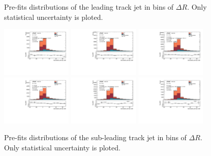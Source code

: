\begin{figure}[htbp]
\caption{Pre-fits \subsdzero distributions of the leading track jet in bins of $\Delta R$. Only statistical uncertainty is ploted.}
  \label{fig:dR-prefits-leading-sub}
\end{figure}


\begin{figure}[htbp]
  \centering
 \includegraphics[width=0.3\textwidth]{figures/gbb/Sub_Sd0_Fits/Canv_PreFit_02-DeltaR-025_LpT_INF_SpT_INF_coarse_y.pdf}
 \includegraphics[width=0.3\textwidth]{figures/gbb/Sub_Sd0_Fits/Canv_PreFit_025-DeltaR-03_LpT_INF_SpT_INF_coarse_y.pdf}
 \includegraphics[width=0.3\textwidth]{figures/gbb/Sub_Sd0_Fits/Canv_PreFit_03-DeltaR-04_LpT_INF_SpT_INF_coarse_y.pdf}\\
 \includegraphics[width=0.3\textwidth]{figures/gbb/Sub_Sd0_Fits/Canv_PreFit_04-DeltaR-05_LpT_INF_SpT_INF_coarse_y.pdf}
 \includegraphics[width=0.3\textwidth]{figures/gbb/Sub_Sd0_Fits/Canv_PreFit_05-DeltaR-06_LpT_INF_SpT_INF_coarse_y.pdf}
 \includegraphics[width=0.3\textwidth]{figures/gbb/Sub_Sd0_Fits/Canv_PreFit_06-DeltaR-07_LpT_INF_SpT_INF_coarse_y.pdf}\\

\caption{Pre-fits \subsdzero distributions of the sub-leading track jet in bins of $\Delta R$. Only statistical uncertainty is ploted.}
  \label{fig:dR-prefits-subleading-sub}
\end{figure}

